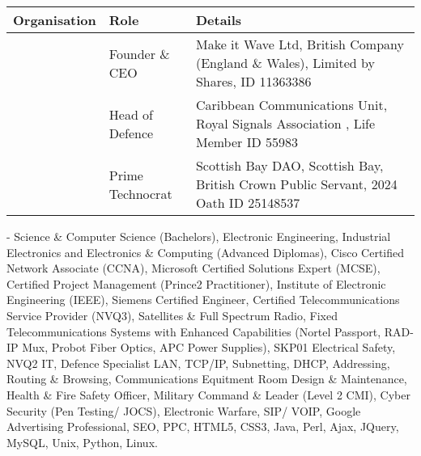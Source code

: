 \documentclass[letterpaper,10pt,english]{sphinxmanual}
\begin{document}
\begin{savenotes}\sphinxattablestart
\centering
\begin{tabulary}{\linewidth}[t]{|T|T|T|}
\hline
\sphinxstyletheadfamily 
Organisation
&\sphinxstyletheadfamily 
Role
&\sphinxstyletheadfamily 
Details
\\
\hline
\noindent{}
&
Founder \& CEO
&
Make it Wave Ltd, British Company (England \& Wales), Limited by Shares, ID 11363386
\\
\hline
\noindent{}
&
Head of Defence
&
Caribbean Communications Unit, Royal Signals Association , Life Member ID 55983
\\
\hline
\noindent{}
&
Prime Technocrat
&
Scottish Bay DAO, Scottish Bay, British Crown Public Servant, 2024 Oath ID 25148537
\\
\hline
\end{tabulary}
\par
\sphinxattableend\end{savenotes}

 - Science \& Computer Science (Bachelors), Electronic Engineering, Industrial Electronics and Electronics \& Computing (Advanced Diplomas), Cisco Certified Network Associate (CCNA), Microsoft Certified Solutions Expert (MCSE), Certified Project Management (Prince2 Practitioner), Institute of Electronic Engineering (IEEE), Siemens Certified Engineer, Certified Telecommunications Service Provider (NVQ3), Satellites \& Full Spectrum Radio, Fixed Telecommunications Systems with Enhanced Capabilities (Nortel Passport, RAD-IP Mux, Probot Fiber Optics, APC Power Supplies), SKP01 Electrical Safety, NVQ2 IT, Defence Specialist LAN, TCP/IP, Subnetting, DHCP, Addressing, Routing \& Browsing, Communications Equitment Room Design \& Maintenance, Health \& Fire Safety Officer, Military Command \& Leader (Level 2 CMI),  Cyber Security (Pen Testing/ JOCS), Electronic Warfare, SIP/ VOIP, Google Advertising Professional, SEO, PPC, HTML5, CSS3, Java, Perl, Ajax, JQuery, MySQL, Unix, Python, Linux.



\renewcommand{\indexname}{Index}
\printindex
\end{document}
